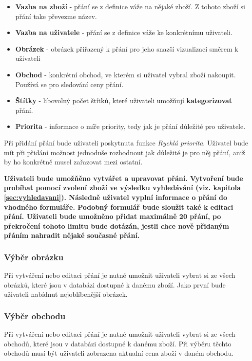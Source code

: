 \begin{itemize}
\item \textbf{Vazba na zboží} - přání se z definice váže na nějaké zboží. Z tohoto zboží si přání take převezme název.
\item \textbf{Vazba na uživatele} - přání se z definice váže ke konkrétnímu uživateli.
\item \textbf{Obrázek} - obrázek přiřazený k přání pro jeho snazší vizualizaci směrem k uživateli
\item \textbf{Obchod} - konkrétní obchod, ve kterém si uživatel vybral zboží nakoupit. Používá se pro sledování ceny přání.
\item \textbf{Štítky} - libovolný počet štítků, které uživateli umožňují \textbf{kategorizovat} přání.
\item \textbf{Priorita} - informace o míře priority, tedy jak je přání důležité pro uživatele.
\end{itemize}

Při přidání přání bude uživateli poskytnuta funkce \emph{Rychlá priorita}. Uživatel bude mít při přidání možnost jednoduše rozhodnout jak důležité je pro něj přání, aniž by ho konkrétně musel zařazovat mezi ostatní.

\textbf{Uživateli bude umožňěno vytvářet a upravovat přání. Vytvoření bude probíhat pomocí zvolení zboží ve výsledku vyhledávání (viz. kapitola \ref{sec:vyhledavani}). Následně uživatel vyplní informace o přání do vhodného formuláře. Podobný formulář bude sloužit také k editaci přání. Uživateli bude umožněno přidat maximálně 20 přání, po překročení tohoto limitu bude dotázán, jestli chce nově přidaným přáním nahradit nějaké současné přání.}

\subsubsection{Výběr obrázku}
Při vytváření nebo editaci přání je nutné umožnit uživateli vybrat si ze všech obrázků, které jsou v databázi dostupné k danému zboží. Jako první bude uživateli nabídnut nejoblíbenější obrázek.

\subsubsection{Výběr obchodu}
Při vytváření nebo editaci přání je nutné umožnit uživateli vybrat si ze všech obchodů, které jsou v databázi dostupné k danému zboží. Při výběru těchto obchodů musí být uživateli zobrazena aktualní cena zboží v daném obchodu.

